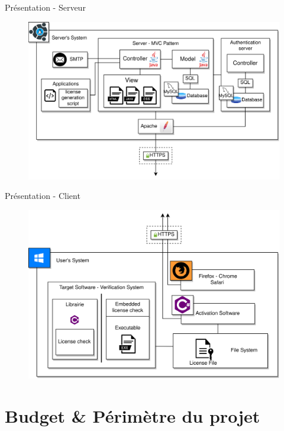 \documentclass{cubeamer}
\begin{document}
\begin{frame}{Présentation - Serveur}
    \begin{figure}
        \centering
        \includegraphics[scale=0.7]{img/DAT-server.png}
    \end{figure}
\end{frame}

\begin{frame}{Présentation - Client}
    \begin{figure}
        \centering
        \vspace{-0.8cm}
        \includegraphics[scale=0.72]{img/DAT-client.png}
    \end{figure}
\end{frame}

\section{Budget \& Périmètre du projet}
\end{document}
